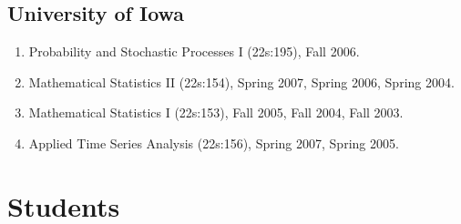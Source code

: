 \documentclass[Statistics]{vita}
\begin{document}
\begin{vita}
    \subsection{University of Iowa}
    \begin{enumerate}
    \item Probability and Stochastic Processes I (22s:195), Fall 2006.
    \item Mathematical Statistics II (22s:154), Spring 2007, Spring 2006, Spring 2004.
    \item Mathematical Statistics I (22s:153), Fall 2005, Fall 2004, Fall 2003.
    \item Applied Time Series Analysis (22s:156), Spring 2007, Spring 2005.
    \end{enumerate}
  \section{Students}

\end{vita}
\end{document}
